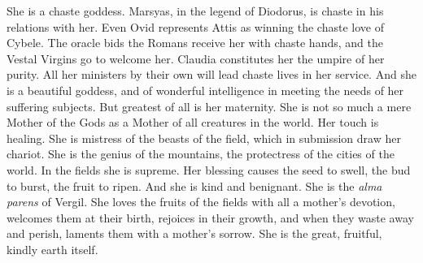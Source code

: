 \documentclass[a4paper, 11pt, oneside, polutonikogreek, french]{article}
\begin{document}
She is a chaste goddess. Marsyas, in the legend of Diodorus, is chaste in his relations with her. Even Ovid represents Attis as winning the chaste love of Cybele. The oracle bids the Romans receive her with chaste hands, and the Vestal Virgins go to welcome her. Claudia constitutes her the umpire of her purity. All her ministers by their own will lead chaste lives in her service. And she is a beautiful goddess, and of wonderful intelligence in meeting the needs of her suffering subjects. But greatest of all is her maternity. She is not so much a mere Mother of the Gods as a Mother of all creatures in the world. Her touch is healing. She is mistress of the beasts of the field, which in submission draw her chariot. She is the genius of the mountains, the protectress of the cities of the world. In the fields she is supreme. Her blessing causes the seed to swell, the bud to burst, the fruit to ripen. And she is kind and benignant. She is the \emph{alma parens} of Vergil. She loves the fruits of the fields with all a mother's devotion, welcomes them at their birth, rejoices in their growth, and when they waste away and perish, laments them with a mother's sorrow. She is the great, fruitful, kindly earth itself.
\end{document}
